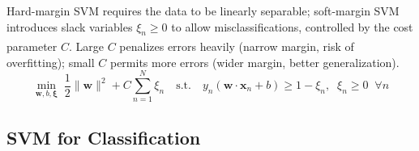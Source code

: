 \begin{tcbitemize}[ skin=sectionraster, halign lower=center ]
    \tcbitem[title={Hard-Margin vs.\ Soft-Margin SVM}, raster multicolumn=6]
    Hard-margin SVM requires the data to be linearly separable; soft-margin SVM introduces slack variables $\xi_n \geq 0$ to allow misclassifications, controlled by the cost parameter $C$\textsuperscript{\cite[][pp.~98--101]{iiiCourseMachineLearning}}. Large $C$ penalizes errors heavily (narrow margin, risk of overfitting); small $C$ permits more errors (wider margin, better generalization).
    \tcblower
    \begin{equation}
        \min_{\mathbf{w},b,\boldsymbol{\xi}}\; \frac{1}{2}\|\mathbf{w}\|^2 + C\sum_{n=1}^{N}\xi_n
        \quad\text{s.t.}\quad
        y_n(\mathbf{w}\cdot\mathbf{x}_n + b) \geq 1 - \xi_n,\;\; \xi_n \geq 0 \;\;\forall n
    \end{equation}
\end{tcbitemize}

\subsection{SVM for Classification}

